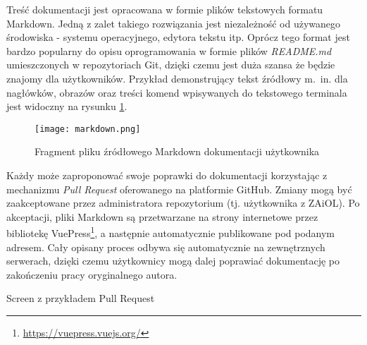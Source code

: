 Treść dokumentacji jest opracowana w formie plików tekstowych formatu Markdown. Jedną z zalet takiego rozwiązania jest niezależność od używanego środowiska - systemu operacyjnego, edytora tekstu itp. Oprócz tego format jest bardzo popularny do opisu oprogramowania w formie plików \emph{README.md} umieszczonych w repozytoriach Git, dzięki czemu jest duża szansa że będzie znajomy dla użytkowników. Przykład demonstrujący tekst źródłowy m.~in. dla nagłówków, obrazów oraz treści komend wpisywanych do tekstowego terminala jest widoczny na rysunku \ref{fig:markdown}.

\begin{figure}[!h]
    \caption{Fragment pliku źródłowego Markdown dokumentacji użytkownika}
    \label{fig:markdown}
    \centering \texttt{[image: markdown.png]}
\end{figure}

Każdy może zaproponować swoje poprawki do dokumentacji korzystając z mechanizmu \emph{Pull Request} oferowanego na platformie GitHub. Zmiany mogą być zaakceptowane przez administratora repozytorium (tj. użytkownika z ZAiOL). Po akceptacji, pliki Markdown są przetwarzane na strony internetowe przez bibliotekę VuePress\footnote{\url{https://vuepress.vuejs.org/}}, a następnie automatycznie publikowane pod podanym adresem. Cały opisany proces odbywa się automatycznie na zewnętrznych serwerach, dzięki czemu użytkownicy mogą dalej poprawiać dokumentację po zakończeniu pracy oryginalnego autora.
\begin{todo}
    Screen z przykładem Pull Request
\end{todo}
